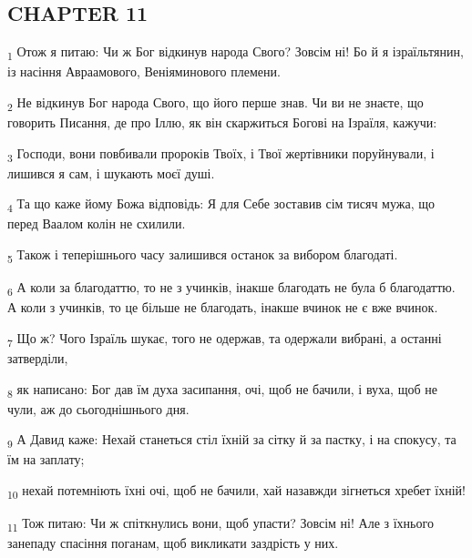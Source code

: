 \subsection{CHAPTER 11}
\begin{tcolorbox}
\textsubscript{1} Отож я питаю: Чи ж Бог відкинув народа Свого? Зовсім ні! Бо й я ізраїльтянин, із насіння Авраамового, Веніяминового племени.
\end{tcolorbox}
\begin{tcolorbox}
\textsubscript{2} Не відкинув Бог народа Свого, що його перше знав. Чи ви не знаєте, що говорить Писання, де про Іллю, як він скаржиться Богові на Ізраїля, кажучи:
\end{tcolorbox}
\begin{tcolorbox}
\textsubscript{3} Господи, вони повбивали пророків Твоїх, і Твої жертівники поруйнували, і лишився я сам, і шукають моєї душі.
\end{tcolorbox}
\begin{tcolorbox}
\textsubscript{4} Та що каже йому Божа відповідь: Я для Себе зоставив сім тисяч мужа, що перед Ваалом колін не схилили.
\end{tcolorbox}
\begin{tcolorbox}
\textsubscript{5} Також і теперішнього часу залишився останок за вибором благодаті.
\end{tcolorbox}
\begin{tcolorbox}
\textsubscript{6} А коли за благодаттю, то не з учинків, інакше благодать не була б благодаттю. А коли з учинків, то це більше не благодать, інакше вчинок не є вже вчинок.
\end{tcolorbox}
\begin{tcolorbox}
\textsubscript{7} Що ж? Чого Ізраїль шукає, того не одержав, та одержали вибрані, а останні затверділи,
\end{tcolorbox}
\begin{tcolorbox}
\textsubscript{8} як написано: Бог дав їм духа засипання, очі, щоб не бачили, і вуха, щоб не чули, аж до сьогоднішнього дня.
\end{tcolorbox}
\begin{tcolorbox}
\textsubscript{9} А Давид каже: Нехай станеться стіл їхній за сітку й за пастку, і на спокусу, та їм на заплату;
\end{tcolorbox}
\begin{tcolorbox}
\textsubscript{10} нехай потемніють їхні очі, щоб не бачили, хай назавжди зігнеться хребет їхній!
\end{tcolorbox}
\begin{tcolorbox}
\textsubscript{11} Тож питаю: Чи ж спіткнулись вони, щоб упасти? Зовсім ні! Але з їхнього занепаду спасіння поганам, щоб викликати заздрість у них.
\end{tcolorbox}
